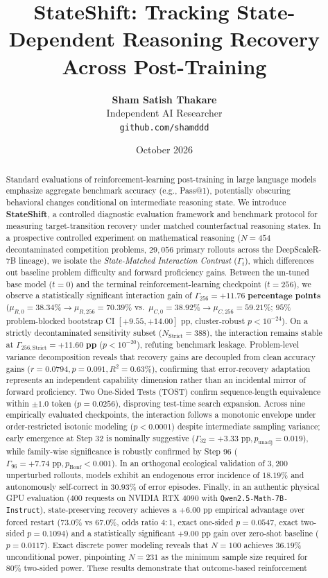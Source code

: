 \documentclass[11pt]{article}
\title{\textbf{StateShift: Tracking State-Dependent Reasoning Recovery\\Across Post-Training}}
\author{
  \textbf{Sham Satish Thakare} \\
  Independent AI Researcher \\
  \texttt{github.com/shamddd} \\
}
\date{October 2026}
\begin{document}
\maketitle

\begin{abstract}
Standard evaluations of reinforcement-learning post-training in large language models emphasize aggregate benchmark accuracy (e.g., Pass@1), potentially obscuring behavioral changes conditional on intermediate reasoning state. We introduce \textbf{StateShift}, a controlled diagnostic evaluation framework and benchmark protocol for measuring target-transition recovery under matched counterfactual reasoning states. In a prospective controlled experiment on mathematical reasoning ($N=454$ decontaminated competition problems, $29,056$ primary rollouts across the DeepScaleR-7B lineage), we isolate the \emph{State-Matched Interaction Contrast} ($\Gamma_t$), which differences out baseline problem difficulty and forward proficiency gains. Between the un-tuned base model ($t=0$) and the terminal reinforcement-learning checkpoint ($t=256$), we observe a statistically significant interaction gain of $\Gamma_{256} = \mathbf{+11.76\text{ percentage points}}$ ($\mu_{R,0}=38.34\% \to \mu_{R,256}=70.39\%$ vs.\ $\mu_{C,0}=38.92\% \to \mu_{C,256}=59.21\%$; $95\%$ problem-blocked bootstrap CI $[+9.55, +14.00]\text{ pp}$, cluster-robust $p < 10^{-24}$). On a strictly decontaminated sensitivity subset ($N_{\text{Strict}}=388$), the interaction remains stable at $\Gamma_{256,\text{Strict}} = \mathbf{+11.60\text{ pp}}$ ($p < 10^{-20}$), refuting benchmark leakage. Problem-level variance decomposition reveals that recovery gains are decoupled from clean accuracy gains ($r = 0.0794, p = 0.091, R^2 = 0.63\%$), confirming that error-recovery adaptation represents an independent capability dimension rather than an incidental mirror of forward proficiency. Two One-Sided Tests (TOST) confirm sequence-length equivalence within $\pm 1.0$ token ($p = 0.0256$), disproving test-time search expansion. Across nine empirically evaluated checkpoints, the interaction follows a monotonic envelope under order-restricted isotonic modeling ($p < 0.0001$) despite intermediate sampling variance; early emergence at Step 32 is nominally suggestive ($\Gamma_{32} = +3.33\text{ pp}, p_{\text{unadj}} = 0.019$), while family-wise significance is robustly confirmed by Step 96 ($\Gamma_{96} = +7.74\text{ pp}, p_{\text{Bonf}} < 0.001$). In an orthogonal ecological validation of $3,200$ unperturbed rollouts, models exhibit an endogenous error incidence of $18.19\%$ and autonomously self-correct in $30.93\%$ of error episodes. Finally, in an authentic physical GPU evaluation ($400$ requests on NVIDIA RTX 4090 with \texttt{Qwen2.5-Math-7B-Instruct}), state-preserving recovery achieves a $+6.00\text{ pp}$ empirical advantage over forced restart ($73.0\%$ vs $67.0\%$, odds ratio $4:1$, exact one-sided $p = 0.0547$, exact two-sided $p = 0.1094$) and a statistically significant $+9.00\text{ pp}$ gain over zero-shot baseline ($p = 0.0117$). Exact discrete power modeling reveals that $N=100$ achieves $36.19\%$ unconditional power, pinpointing $N=231$ as the minimum sample size required for $80\%$ two-sided power. These results demonstrate that outcome-based reinforcement 
\end{abstract}
\end{document}
